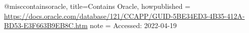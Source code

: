 @misc{containsoracle,
    title={Contains Oracle},
    howpublished = {\url{https://docs.oracle.com/database/121/CCAPP/GUID-5BE34ED3-4B35-412A-BD53-E3F663B9EB8C.htm}}
    note = {Accessed: 2022-04-19 }
} 

